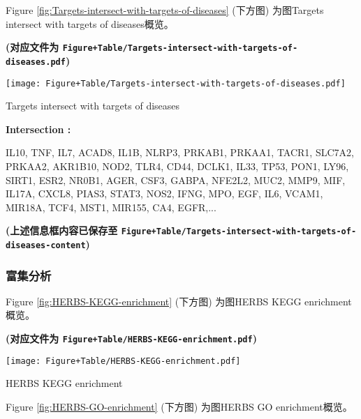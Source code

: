 \documentclass[
]{article}
\begin{document}
Figure \ref{fig:Targets-intersect-with-targets-of-diseases} (下方图) 为图Targets intersect with targets of diseases概览。

\textbf{(对应文件为 \texttt{Figure+Table/Targets-intersect-with-targets-of-diseases.pdf})}

\def\@captype{figure}
\begin{center}
\texttt{[image: Figure+Table/Targets-intersect-with-targets-of-diseases.pdf]}
\caption{Targets intersect with targets of diseases}\label{fig:Targets-intersect-with-targets-of-diseases}
\end{center}
\begin{center}\begin{tcolorbox}[colback=gray!10, colframe=gray!50, width=0.9\linewidth, arc=1mm, boxrule=0.5pt]
\textbf{
Intersection
:}

\vspace{0.5em}

    IL10, TNF, IL7, ACAD8, IL1B, NLRP3, PRKAB1, PRKAA1,
TACR1, SLC7A2, PRKAA2, AKR1B10, NOD2, TLR4, CD44, DCLK1,
IL33, TP53, PON1, LY96, SIRT1, ESR2, NR0B1, AGER, CSF3,
GABPA, NFE2L2, MUC2, MMP9, MIF, IL17A, CXCL8, PIAS3, STAT3,
NOS2, IFNG, MPO, EGF, IL6, VCAM1, MIR18A, TCF4, MST1,
MIR155, CA4, EGFR,...

\vspace{2em}
\end{tcolorbox}
\end{center}

\textbf{(上述信息框内容已保存至 \texttt{Figure+Table/Targets-intersect-with-targets-of-diseases-content})}

\hypertarget{ux5bccux96c6ux5206ux6790}{%
\subsubsection{富集分析}\label{ux5bccux96c6ux5206ux6790}}

Figure \ref{fig:HERBS-KEGG-enrichment} (下方图) 为图HERBS KEGG enrichment概览。

\textbf{(对应文件为 \texttt{Figure+Table/HERBS-KEGG-enrichment.pdf})}

\def\@captype{figure}
\begin{center}
\texttt{[image: Figure+Table/HERBS-KEGG-enrichment.pdf]}
\caption{HERBS KEGG enrichment}\label{fig:HERBS-KEGG-enrichment}
\end{center}

Figure \ref{fig:HERBS-GO-enrichment} (下方图) 为图HERBS GO enrichment概览。
\end{document}
